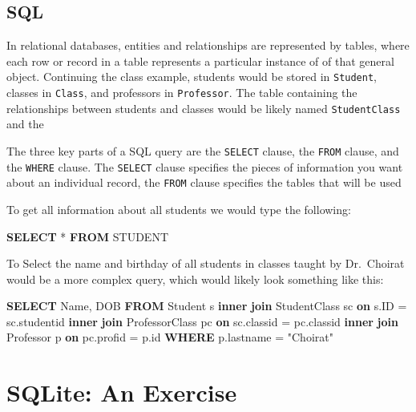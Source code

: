 \documentclass[]{book}
\newenvironment{Shaded}{\begin{snugshade}}{\end{snugshade}}
\newcommand{\KeywordTok}[1]{\textcolor[rgb]{0.13,0.29,0.53}{\textbf{#1}}}
\newcommand{\OtherTok}[1]{\textcolor[rgb]{0.56,0.35,0.01}{#1}}
\newcommand{\NormalTok}[1]{#1}
\theoremstyle{definition}
\theoremstyle{definition}
\theoremstyle{definition}
\theoremstyle{remark}
\begin{document}
\subsection{SQL}\label{sql}

In relational databases, entities and relationships are represented by
tables, where each row or record in a table represents a particular
instance of of that general object. Continuing the class example,
students would be stored in \texttt{Student}, classes in \texttt{Class},
and professors in \texttt{Professor}. The table containing the
relationships between students and classes would be likely named
\texttt{StudentClass} and the

The three key parts of a SQL query are the \texttt{SELECT} clause, the
\texttt{FROM} clause, and the \texttt{WHERE} clause. The \texttt{SELECT}
clause specifies the pieces of information you want about an individual
record, the \texttt{FROM} clause specifies the tables that will be used

To get all information about all students we would type the following:

\begin{Shaded}
\begin{Highlighting}[]
\KeywordTok{SELECT}\NormalTok{ * }\KeywordTok{FROM}\NormalTok{ STUDENT}
\end{Highlighting}
\end{Shaded}

To Select the name and birthday of all students in classes taught by
Dr.~Choirat would be a more complex query, which would likely look
something like this:

\begin{Shaded}
\begin{Highlighting}[]
   \KeywordTok{SELECT}\NormalTok{ Name,}
\NormalTok{          DOB}
   \KeywordTok{FROM}\NormalTok{ Student s }
        \KeywordTok{inner} \KeywordTok{join}\NormalTok{ StudentClass sc }\KeywordTok{on} 
\NormalTok{            s.ID = sc.studentid}
        \KeywordTok{inner} \KeywordTok{join}\NormalTok{ ProfessorClass pc }\KeywordTok{on}
\NormalTok{            sc.classid = pc.classid}
        \KeywordTok{inner} \KeywordTok{join}\NormalTok{ Professor p }\KeywordTok{on}
\NormalTok{            pc.profid = p.id}
    \KeywordTok{WHERE}\NormalTok{ p.lastname = }\OtherTok{"Choirat"}
\end{Highlighting}
\end{Shaded}

\section{SQLite: An Exercise}\label{sqlite-an-exercise}
\end{document}
